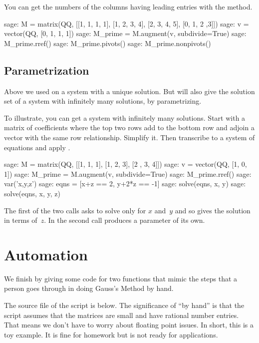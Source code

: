 You can get the numbers of the columns having leading entries with 
the  method.
\begin{sagecommandline}
sage: M = matrix(QQ, [[1, 1, 1, 1], [1, 2, 3, 4], [2, 3, 4, 5], [0, 1, 2 ,3]]) 
sage: v = vector(QQ, [0, 1, 1, 1])
sage: M_prime = M.augment(v, subdivide=True)
sage: M_prime.rref()
sage: M_prime.pivots()         
sage: M_prime.nonpivots()         
\end{sagecommandline}





\subsection{Parametrization}
Above we used  on a system with a unique solution.
But  will also give the solution set of a system
with infinitely many solutions, by parametrizing.

To illustrate, you can get
a system with infinitely many solutions.
Start with a matrix of coefficients
where the top two rows add to the bottom row
and adjoin a vector with the same row relationship. 
Simplify it.
Then transcribe to a system of equations and apply .
\begin{sagecommandline}
sage: M = matrix(QQ, [[1, 1, 1], [1, 2, 3], [2 , 3, 4]])    
sage: v = vector(QQ, [1, 0, 1])                            
sage: M_prime = M.augment(v, subdivide=True)               
sage: M_prime.rref()
sage: var('x,y,z')          
sage: eqns = [x+z == 2, y+2*z == -1]
sage: solve(eqns, x, y)   
sage: solve(eqns, x, y, z)                                 
\end{sagecommandline}
The first of the two  calls asks  
to solve only for $x$ and~$y$ and so \Sage{} gives
the solution in terms of~$z$.
In the second call \Sage{} produces a parameter of its own.   




\section{Automation}

We finish by giving some \python{} code for two functions 
that mimic the steps that a person goes through in 
doing Gauss's Method by hand.

The source file of the script is below. 
The significance of ``by hand'' is that the script
assumes that the matrices are small and have rational number entries.
That means we don't have to worry about floating point issues.
In short, this is a toy example.
It is fine for homework but is not ready for applications.


